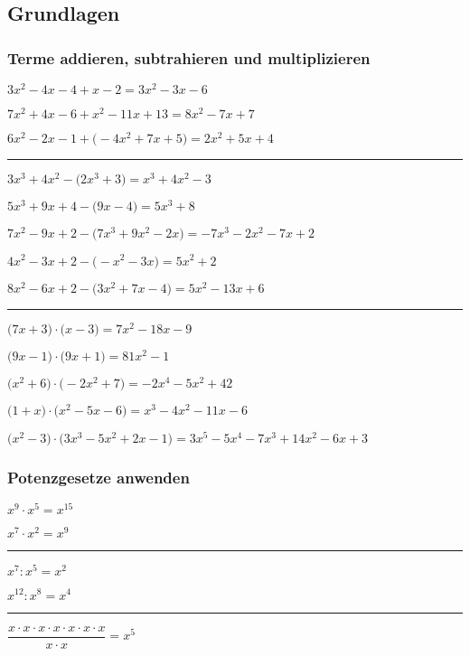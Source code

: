\subsection{Grundlagen}\label{grundlagen}

\subsubsection{Terme addieren, subtrahieren und multiplizieren}

\begin{aufgaben}
\item $3 x^2-4 x-4 +  x-2 = 3 x^2-3 x-6$
\item $7 x^2+4 x-6 +  x^2-11 x+13 = 8 x^2-7 x+7$
\item $6 x^2-2 x-1 + \big(-4 x^2+7 x+5\big) = 2 x^2+5 x+4$ \\
\hrule
\item $3 x^3+4 x^2 - \big(2 x^3+3\big) =  x^3+4 x^2-3$
\item $5 x^3+9 x+4 - \big(9 x-4\big) = 5 x^3+8$
\item $7 x^2-9 x+2 - \big(7 x^3+9 x^2-2 x\big) = -7 x^3-2 x^2-7 x+2$
\item $4 x^2-3 x+2 - \big(- x^2-3 x\big) = 5 x^2+2$
\item $8 x^2-6 x+2 - \big(3 x^2+7 x-4\big) = 5 x^2-13 x+6$ \\
\hrule
\item $\big(7 x+3\big) \cdot \big( x-3\big) = 7 x^2-18 x-9$ \\
\item $\big(9 x-1\big) \cdot \big(9 x+1\big) = 81 x^2-1$ \\
\item $\big( x^2+6\big) \cdot \big(-2 x^2+7\big) = -2 x^4-5 x^2+42$ \\
\item $\big( 1+x\big) \cdot \big( x^2-5 x-6\big) =  x^3-4 x^2-11 x-6$ \\
\item $\big( x^2-3\big) \cdot \big(3 x^3-5 x^2+2 x-1\big) = 3 x^5-5 x^4-7 x^3+14 x^2-6 x+3$
\end{aufgaben}

\subsubsection{Potenzgesetze anwenden}

\begin{aufgaben}
\item $x^9\cdot x^5=x^{15}$
\item $x^7\cdot x^2=x^9$
\hrule
\item $x^7:x^5 = x^2$
\item $x^{12}:x^{8}=x^4$
\hrule
\item $\dfrac{x\cdot x\cdot x\cdot x\cdot x\cdot x\cdot x}{x\cdot x}=x^5$
\end{aufgaben}